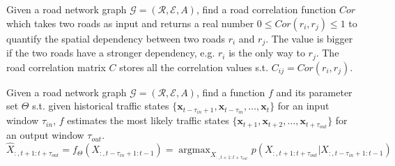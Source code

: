 \begin{problem}
    Given a road network graph $\mathcal{G}=(\mathcal{R}, \mathcal{E}, A)$, find a road correlation function $Cor$ which takes two roads as input and returns a real number $0\leqslant Cor(r_i, r_j)\leqslant 1$ to quantify the spatial dependency between two roads $r_i$ and $r_j$. The value is bigger if the two roads have a stronger dependency, e.g. $r_i$ is the only way to $r_j$. The road correlation matrix $C$ stores all the correlation values s.t. $C_{ij}=Cor(r_i, r_j)$.
\end{problem}

\begin{problem}
    Given a road network graph $\mathcal{G}=(\mathcal{R}, \mathcal{E}, A)$, find a function $f$ and its parameter set $\Theta$ s.t. given historical traffic states $\{\mathbf{x}_{t-\tau_{in}+1}, \mathbf{x}_{t-\tau_{in}}, \dots, \mathbf{x}_t \}$ for an input window $\tau_{in}$, $f$ estimates the most likely traffic states $\{\mathbf{x}_{t+1}, \mathbf{x}_{t+2}, \dots, \mathbf{x}_{t+\tau_{out}} \}$ for an output window $\tau_{out}$.
    \begin{equation}
        \hat X_{:, t+1:t+\tau_{out}}=f_\Theta(X_{:, t-\tau_{in}+1:t-1})=\mathop{\arg\max}_{X_{:, t+1:t+\tau_{out}}} p(X_{:, t+1:t+\tau_{out}}|X_{:, t-\tau_{in}+1:t-1})
    \end{equation}
\end{problem}
